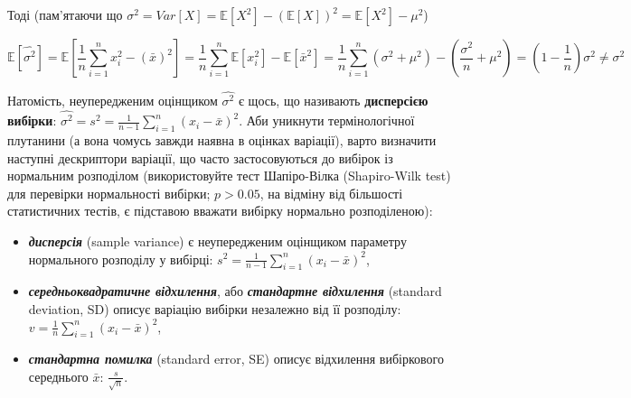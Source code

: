 \documentclass[
  11pt,
]{book}
\begin{document}
Тоді (пам'ятаючи що
\(\sigma^2 = Var[X] = \mathbb{E} [X^2] - (\mathbb{E} [X])^2 = \mathbb{E} [X^2] - \mu^2\))

\[\mathbb{E} [\hat{\sigma^2}] = \mathbb{E} \left[ \frac{1}{n} \sum \limits_{i=1}^n x_i^2 - (\bar{x})^2 \right] = \frac{1}{n} \sum \limits_{i = 1}^n \mathbb{E} [x_i^2] - \mathbb{E} [\bar{x}^2] = \frac{1}{n}  \sum \limits_{i = 1}^n (\sigma^2 + \mu^2) - (\frac{\sigma^2}{n} + \mu^2) = (1 - \frac{1}{n}) \sigma^2 \neq \sigma^2\]

Натомість, неупередженим оцінщиком \(\hat{\sigma^2}\) є щось, що
називають \textbf{дисперсією вибірки}:
\(\hat{\sigma^2} = s^2 = \frac{1}{n-1} \sum \limits_{i=1}^n (x_i - \bar{x})^2\).
Аби уникнути термінологічної плутанини (а вона чомусь завжди наявна в
оцінках варіації), варто визначити наступні дескриптори варіації, що
часто застосовуються до вибірок із нормальним розподілом (використовуйте
тест Шапіро-Вілка (Shapiro-Wilk test) для перевірки нормальності
вибірки; \(p > 0.05\), на відміну від більшості статистичних тестів, є
підставою вважати вибірку нормально розподіленою):

\begin{itemize}
\item
  \textbf{\emph{дисперсія}} (sample variance) є неупередженим оцінщиком
  параметру нормального розподілу у вибірці:
  \(s^2 = \frac{1}{n-1} \sum \limits_{i=1}^n (x_i - \bar{x})^2\),
\item
  \textbf{\emph{середньоквадратичне відхилення}}, або
  \textbf{\emph{стандартне відхилення}} (standard deviation, SD) описує
  варіацію вибірки незалежно від її розподілу:
  \(v = \frac{1}{n} \sum \limits_{i=1}^n (x_i - \bar{x})^2\),
\item
  \textbf{\emph{стандартна помилка}} (standard error, SE) описує
  відхилення вибіркового середнього \(\bar{x}\): \(\frac{s}{\sqrt{n}}\).
\end{itemize}
\end{document}
